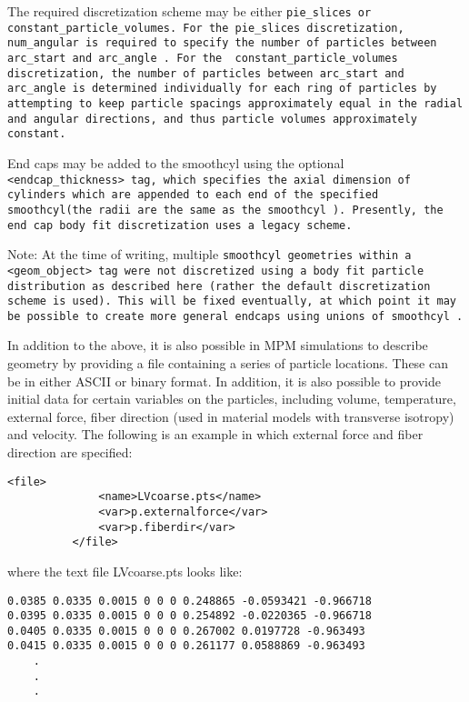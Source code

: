 The required discretization scheme may be either \tt pie\_slices
\normalfont or \tt constant\_particle\_volumes\normalfont.  For the
\tt pie\_slices \normalfont discretization, \tt num\_angular
\normalfont is required to specify the number of particles between \tt
arc\_start \normalfont and \tt arc\_angle \normalfont.  For the \tt
constant\_particle\_volumes \normalfont discretization, the number of
particles between \tt arc\_start \normalfont and \tt arc\_angle
\normalfont is determined individually for each ring of particles by
attempting to keep particle spacings approximately equal in the radial
and angular directions, and thus particle volumes approximately
constant.

End caps may be added to the smoothcyl using the optional \tt
<endcap\_thickness> \normalfont tag, which specifies the axial
dimension of cylinders which are appended to each end of the specified
\tt smoothcyl\normalfont (the radii are the same as the \tt smoothcyl
\normalfont).  Presently, the end cap body fit discretization uses a
legacy scheme.

Note: At the time of writing, multiple \tt smoothcyl \normalfont
geometries within a \tt <geom\_object> \normalfont tag were not
discretized using a body fit particle distribution as described here
(rather the default discretization scheme is used).  This will be
fixed eventually, at which point it may be possible to create more
general endcaps using unions of \tt smoothcyl \normalfont.

In addition to the above, it is also possible in MPM simulations to describe
geometry by providing a file containing a series of particle locations.  These
can be in either ASCII or binary format.  In addition, it is also possible to
provide initial data for certain variables on the particles, including
volume, temperature, external force, fiber direction (used in material models
with transverse isotropy) and velocity.  The following is an example in which
external force and fiber direction are specified:

\begin{Verbatim}[fontsize=\footnotesize]
          <file>
              <name>LVcoarse.pts</name>
              <var>p.externalforce</var>
              <var>p.fiberdir</var>
          </file>
\end{Verbatim}

where the text file LVcoarse.pts looks like:

\begin{Verbatim}[fontsize=\footnotesize]
0.0385 0.0335 0.0015 0 0 0 0.248865 -0.0593421 -0.966718
0.0395 0.0335 0.0015 0 0 0 0.254892 -0.0220365 -0.966718
0.0405 0.0335 0.0015 0 0 0 0.267002 0.0197728 -0.963493
0.0415 0.0335 0.0015 0 0 0 0.261177 0.0588869 -0.963493
	.
	.
	.
\end{Verbatim}

